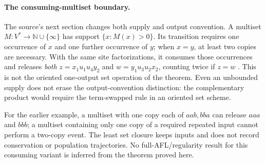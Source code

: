 \paragraph{The consuming-multiset boundary.}
The source's next section changes both supply and output convention.
A multiset \(M:V^*\to\mathbb N\cup\{\infty\}\) has support
\(\{x:M(x)>0\}\). Its transition requires one occurrence of \(x\)
and one further occurrence of \(y\); when \(x=y\), at least two copies
are necessary. With the same site factorizations, it consumes those
occurrences and releases \emph{both}
\(z=x_1u_1u_4y_2\) and \(w=y_1u_3u_2x_2\), counting twice if \(z=w\)
\cite[p.~319]{HeadPaunPixton1997RecombinationIntake}.
This is not the oriented one-output set operation of the theorem.
Even an unbounded supply does not erase the output-convention distinction:
the complementary product would require the term-swapped rule in an
oriented set scheme.

For the earlier example, a multiset with one copy each of \(aab,bba\)
can release \(aaa\) and \(bbb\); a multiset containing only one copy
of a required repeated input cannot perform a two-copy event.
The least set closure keeps inputs and does not record conservation or
population trajectories. No full-AFL/regularity result for this consuming
variant is inferred from the theorem proved here.
